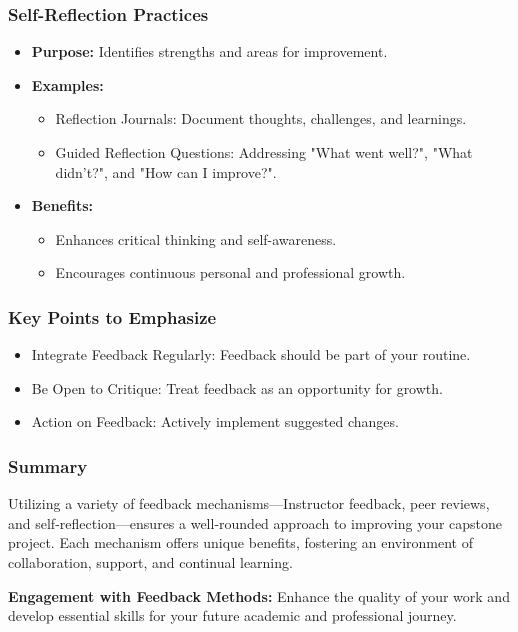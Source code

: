 \documentclass{beamer}
\begin{document}
\begin{frame}[fragile]
    \frametitle{Self-Reflection Practices}
    \begin{itemize}
        \item \textbf{Purpose:} Identifies strengths and areas for improvement.
        \item \textbf{Examples:}
            \begin{itemize}
                \item Reflection Journals: Document thoughts, challenges, and learnings.
                \item Guided Reflection Questions: Addressing "What went well?", "What didn't?", and "How can I improve?".
            \end{itemize}
        \item \textbf{Benefits:}
            \begin{itemize}
                \item Enhances critical thinking and self-awareness.
                \item Encourages continuous personal and professional growth.
            \end{itemize}
    \end{itemize}
\end{frame}

\begin{frame}[fragile]
    \frametitle{Key Points to Emphasize}
    \begin{itemize}
        \item Integrate Feedback Regularly: Feedback should be part of your routine.
        \item Be Open to Critique: Treat feedback as an opportunity for growth.
        \item Action on Feedback: Actively implement suggested changes.
    \end{itemize}
\end{frame}

\begin{frame}[fragile]
    \frametitle{Summary}
    Utilizing a variety of feedback mechanisms—Instructor feedback, peer reviews, and self-reflection—ensures a well-rounded approach to improving your capstone project. Each mechanism offers unique benefits, fostering an environment of collaboration, support, and continual learning.

    \textbf{Engagement with Feedback Methods:} Enhance the quality of your work and develop essential skills for your future academic and professional journey.
\end{frame}
\end{document}
